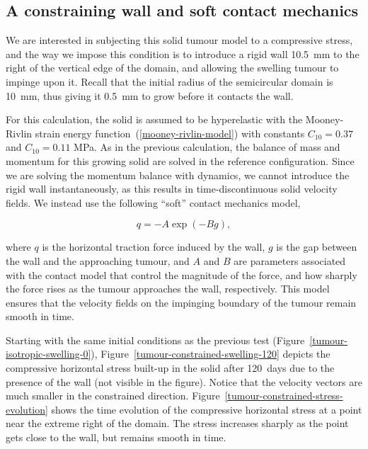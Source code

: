 \subsection{A constraining wall and soft contact mechanics}
\label{wall-constraint}

We are interested in subjecting this solid tumour model to a
compressive stress, and the way we impose this condition is to
introduce a rigid wall 10.5~mm to the right of the vertical edge of
the domain, and allowing the swelling tumour to impinge upon
it. Recall that the initial radius of the semicircular domain is
10~mm, thus giving it 0.5~mm to grow before it contacts the wall.

For this calculation, the solid is assumed to be hyperelastic with the
Mooney-Rivlin strain energy function~(\ref{mooney-rivlin-model}) with
constants $C_{10}=0.37$ and $C_{10}=0.11$ MPa. As in the previous
calculation, the balance of mass and momentum for this growing solid
are solved in the reference configuration. Since we are solving the
momentum balance with dynamics, we cannot introduce the rigid wall
instantaneously, as this results in time-discontinuous solid velocity
fields. We instead use the following ``soft'' contact mechanics model,

\begin{equation}
q = - A \exp (-B g),
\end{equation}

\noindent where $q$ is the horizontal traction force induced by the
wall, $g$ is the gap between the wall and the approaching tumour, and
$A$ and $B$ are parameters associated with the contact model that
control the magnitude of the force, and how sharply the force rises as
the tumour approaches the wall, respectively. This model ensures that
the velocity fields on the impinging boundary of the tumour remain
smooth in time.

Starting with the same initial conditions as the previous test
(Figure~\ref{tumour-isotropic-swelling-0}),
Figure~\ref{tumour-constrained-swelling-120} depicts the compressive
horizontal stress built-up in the solid after 120~days due to the
presence of the wall (not visible in the figure). Notice that the
velocity vectors are much smaller in the constrained
direction. Figure~\ref{tumour-constrained-stress-evolution} shows the
time evolution of the compressive horizontal stress at a point near
the extreme right of the domain. The stress increases sharply as the
point gets close to the wall, but remains smooth in time.

